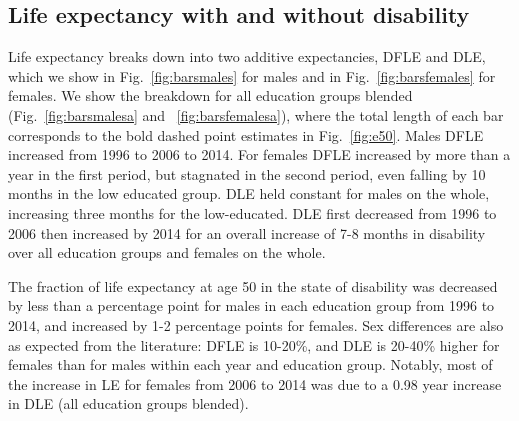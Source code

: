 \subsection{Life expectancy with and without disability}

Life expectancy breaks down into two additive expectancies, DFLE and DLE, which we show in Fig.~\ref{fig:barsmales} for males and in Fig.~\ref{fig:barsfemales} for females. We show the breakdown for all education groups blended (Fig.~\ref{fig:barsmalesa} and ~\ref{fig:barsfemalesa}), where the total length of each bar corresponds to the bold dashed point estimates in Fig.~\ref{fig:e50}. Males DFLE increased from 1996 to 2006 to 2014. For females DFLE increased by more than a year in the first period, but stagnated in the second period, even falling by 10 months in the low educated group. DLE held constant for males on the whole, increasing three months for the low-educated. DLE first decreased from 1996 to 2006 then increased by 2014 for an overall increase of 7-8 months in disability over all education groups and females on the whole.  

The fraction of life expectancy at age 50 in the state of disability was decreased by less than a percentage point for males in each education group from 1996 to 2014, and increased by 1-2 percentage points for females. Sex differences are also as expected from the literature: DFLE is 10-20\%, and DLE is 20-40\% higher for females than for males within each year and education group. Notably, most of the increase in LE for females from 2006 to 2014 was due to a 0.98 year increase in DLE (all education groups blended). 

